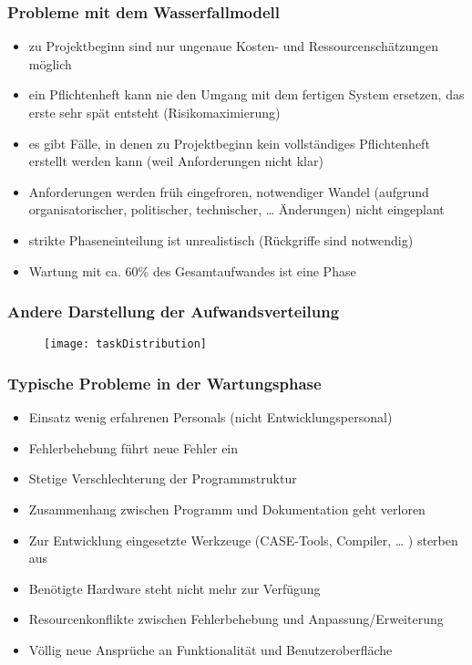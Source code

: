 	\subsubsection{Probleme mit dem Wasserfallmodell}
	\begin{itemize}
		\item zu Projektbeginn sind nur ungenaue Kosten- und Ressourcenschätzungen möglich
		\item ein Pflichtenheft kann nie den Umgang mit dem fertigen System ersetzen, das erste sehr spät entsteht (Risikomaximierung)
		\item es gibt Fälle, in denen zu Projektbeginn kein vollständiges Pflichtenheft erstellt werden kann (weil Anforderungen nicht klar)
		\item Anforderungen werden früh eingefroren, notwendiger Wandel (aufgrund organisatorischer, politischer, technischer, … Änderungen) nicht eingeplant
		\item strikte Phaseneinteilung ist unrealistisch (Rückgriffe sind notwendig)
		\item Wartung mit ca. 60\% des Gesamtaufwandes ist eine Phase
	\end{itemize}
	\subsubsection{Andere Darstellung der Aufwandsverteilung}
	\begin{figure}[h]
		\centering
		\texttt{[image: taskDistribution]}
	\end{figure}
	\subsubsection{Typische Probleme in der Wartungsphase}
	\begin{itemize}
		\item Einsatz wenig erfahrenen Personals (nicht Entwicklungspersonal)
		\item Fehlerbehebung führt neue Fehler ein
		\item Stetige Verschlechterung der Programmstruktur
		\item Zusammenhang zwischen Programm und Dokumentation geht verloren
		\item Zur Entwicklung eingesetzte Werkzeuge (CASE-Tools, Compiler, … ) sterben aus
		\item Benötigte Hardware steht nicht mehr zur Verfügung
		\item Resourcenkonflikte zwischen Fehlerbehebung und Anpassung/Erweiterung
		\item Völlig neue Ansprüche an Funktionalität und Benutzeroberfläche
	\end{itemize}
